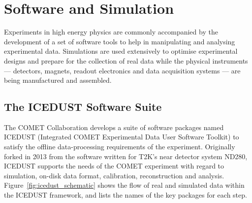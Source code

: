 \chapter{Software and Simulation}
\label{chapter3}

\newcommand{\SimG}{\texttt{SimG4}\xspace}
\newcommand{\oaEvent}{\texttt{oaEvent}\xspace}
\newcommand{\Geant}{{\sc Geant4}\xspace}


 
    
    
    



Experiments in high energy physics are commonly accompanied by the development
of a set of software tools to help in manipulating and analysing experimental
data. Simulations are used extensively to optimise experimental designs and
prepare for the collection of real data while the physical instruments ---
detectors, magnets, readout electronics and data acquisition systems --- are
being manufactured and assembled.

\section{The ICEDUST Software Suite}
The COMET Collaboration develops a suite of software packages named ICEDUST
(Integrated COMET Experimental Data User Software Toolkit) to satisfy the
offline data-processing requirements of the experiment. Originally forked in
2013 from the software written for T2K's near detector system ND280, ICEDUST
supports the needs of the COMET experiment with regard to simulation, on-disk
data format, calibration, reconstruction and analysis.
Figure~\ref{fig:icedust_schematic} shows the flow of real and simulated data
within the ICEDUST framework, and lists the names of the key packages for each
step.


